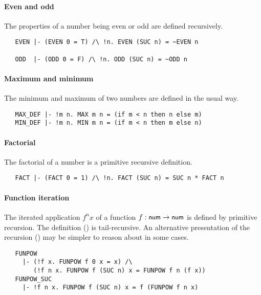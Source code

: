 \paragraph{Even and odd}

The properties of a number being even or odd are defined recursively.
%
\begin{hol}
{\small
\begin{verbatim}
   EVEN |- (EVEN 0 = T) /\ !n. EVEN (SUC n) = ~EVEN n

   ODD  |- (ODD 0 = F) /\ !n. ODD (SUC n) = ~ODD n
\end{verbatim}
}
\end{hol}

\paragraph{Maximum and minimum}

The minimum and maximum of two numbers are defined in the usual way.
%
\begin{hol}
{\small
\begin{verbatim}
   MAX_DEF |- !m n. MAX m n = (if m < n then n else m)
   MIN_DEF |- !m n. MIN m n = (if m < n then m else n)
\end{verbatim}
}
\end{hol}

\paragraph{Factorial}

The factorial of a number is a primitive recursive definition.
%
\begin{hol}
{\small
\begin{verbatim}
   FACT |- (FACT 0 = 1) /\ !n. FACT (SUC n) = SUC n * FACT n
\end{verbatim}
}
\end{hol}

\paragraph{Function iteration}

The iterated application $f^n x$ of a function $f : \mbox{\small{\textbf{\sf{num}}}} \to
\mbox{\small{\textbf{\sf{num}}}}$ is defined by primitive recursion. The definition
() is tail-recursive. An alternative presentation of the
recursion () may be simpler to reason about in some
cases.
%
\begin{hol}
{\small
\begin{verbatim}
   FUNPOW
     |- (!f x. FUNPOW f 0 x = x) /\
        (!f n x. FUNPOW f (SUC n) x = FUNPOW f n (f x))
   FUNPOW_SUC
     |- !f n x. FUNPOW f (SUC n) x = f (FUNPOW f n x)
\end{verbatim}
}
\end{hol}

